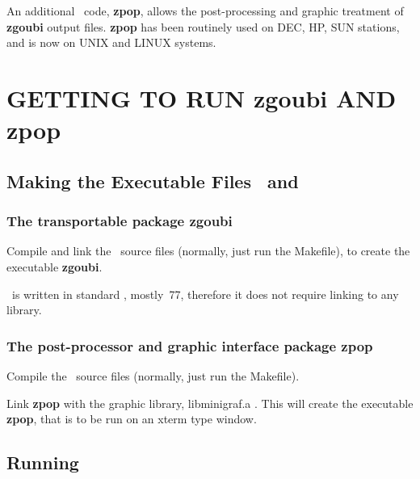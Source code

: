 \bigskip

\noindent An additional \FORTRAN\ code, \textbf{zpop},
allows the post-processing and graphic treatment of \textbf{zgoubi} output 
files. \textbf{zpop} has been routinely used on DEC, HP, SUN stations, and is now on UNIX and LINUX systems.
\bigskip

\section{GETTING TO RUN zgoubi AND zpop} %

\subsection{Making the Executable Files \zgoubi\ and \zpop}

\subsubsection{The transportable package zgoubi}

Compile and link the \FORTRAN\ source files  (normally, just run the Makefile), to create the 
executable \textbf{zgoubi}.
\bigskip

\noindent \zgoubi\ is  written in standard 
\FORTRAN, mostly~77, therefore it does not require linking  to any library. 


\subsubsection{The post-processor and graphic interface package zpop} 

Compile  the  \FORTRAN\ source files  (normally, just run the Makefile). 
\bigskip


\noindent Link \textbf{zpop} with the graphic library, libminigraf.a 
\cite{HAMEL}. This will create the executable \textbf{zpop}, that is to be run on an 
xterm type window. 
\bigskip

 \subsection{Running \zgoubi \label{SecRunZgoubi}}  

